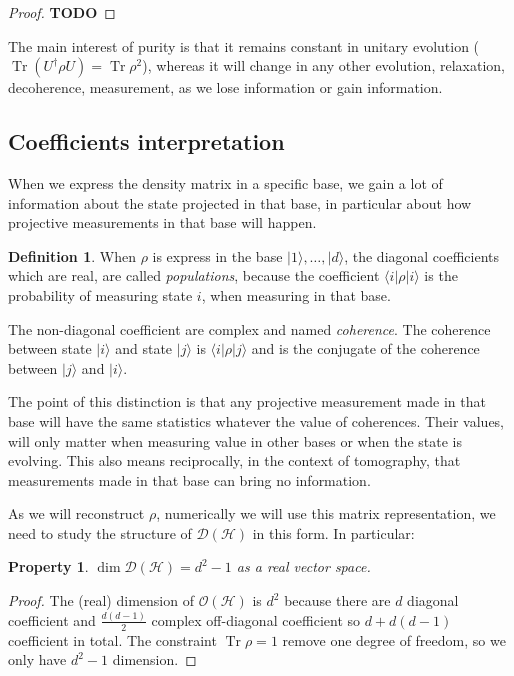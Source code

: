 \documentclass[10pt]{report}
\theoremstyle{plain}
\newtheorem{prop}[thm]{Property}
\theoremstyle{definition}
\newtheorem{defn}{Definition}[chapter]
\theoremstyle{remark}
\newcommand{\TODO}{\textbf{TODO}}
\newcommand{\ket}[1]{|#1\rangle}
\newcommand{\bra}[1]{\langle#1|}
\DeclareMathOperator{\Tr}{Tr}
\begin{document}
\begin{proof}
   \TODO
\end{proof}

The main interest of purity is that it remains constant in unitary evolution
($\Tr (U^\dagger \rho U) = \Tr \rho^2$),
whereas it will change in any other evolution, relaxation, decoherence,
measurement, as we lose information or gain information.

\subsection{Coefficients interpretation}

When we express the density matrix in a specific base, we gain a lot of
information about the state projected in that base, in particular about how
projective measurements in that base will happen.

\begin{defn}
  When $\rho$ is express in the base $\ket 1, \ldots, \ket d$, the diagonal
  coefficients which are real, are called \emph{populations}, because the
  coefficient $\bra i \rho \ket i$ is the probability of measuring state $i$,
  when measuring in that base.

  The non-diagonal coefficient are complex and named \emph{coherence}. The
  coherence between state $\ket i$ and state $\ket j$ is $\bra i \rho \ket j$
  and is the conjugate of the coherence between $\ket j$ and $\ket i$.
\end{defn}

The point of this distinction is that any projective measurement made in that
base will have the same statistics whatever the value of coherences. Their
values, will only matter when measuring value in other bases or when the state
is evolving. This also means reciprocally, in the context of tomography,
that measurements made in that base can bring no information.

As we will reconstruct $\rho$, numerically we will use this matrix
representation, we need to study the structure of $\mathcal{D}(\mathcal{H})$ in
this form. In particular:

\begin{prop}
  $\dim \mathcal{D}(\mathcal{H}) = d^2 - 1 $ as a real vector space.
\end{prop}

\begin{proof}
  The (real) dimension of $\mathcal{O}(\mathcal{H})$ is $d^2$ because there are $d$ diagonal
  coefficient and $\frac {d(d-1)} 2$ complex off-diagonal coefficient so $d +
  d(d-1)$ coefficient in total. The constraint $\Tr \rho = 1$ remove one degree
  of freedom, so we only have $d^2 -1$ dimension.
\end{proof}
\end{document}
